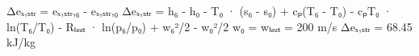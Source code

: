 Δeₓ,ₛₜᵣ = eₓ,ₛₜᵣ,₆ - eₓ,ₛₜᵣ,₀  
Δeₓ,ₛₜᵣ = h₆ - h₀ - T₀ · (s₆ - s₀) + cₚ(T₆ - T₀) - cₚT₀ · ln(T₆/T₀) - Rₗₐᵤₜ · ln(p₆/p₀) + w₆²/2 - w₀²/2  
w₀ = wₗₐᵤₜ = 200 m/s  
Δeₓ,ₛₜᵣ = 68.45 kJ/kg